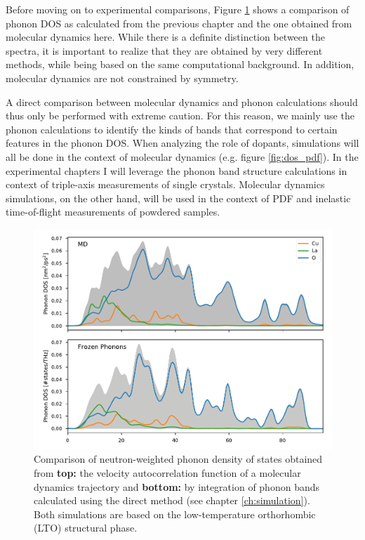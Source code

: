 Before moving on to experimental comparisons, Figure \ref{fig:md_phonopy_comparison} shows a comparison of phonon DOS as calculated from the previous chapter and the one obtained from molecular dynamics here. While there is a definite distinction between the spectra, it is important to realize that they are obtained by very different methods, while being based on the same computational background. In addition, molecular dynamics are not constrained by symmetry.

A direct comparison between molecular dynamics and phonon calculations should thus only be performed with extreme caution. For this reason, we mainly use the phonon calculations to identify the kinds of bands that correspond to certain features in the phonon DOS. When analyzing the role of dopants, simulations will all be done in the context of molecular dynamics (e.g. figure \ref{fig:dos_pdf}). In the experimental chapters I will leverage the phonon band structure calculations in context of triple-axis measurements of single crystals. Molecular dynamics simulations, on the other hand, will be used in the context of PDF and inelastic time-of-flight measurements of powdered samples.


\begin{figure}
	\centering
	\includegraphics[width=\textwidth]{fig/md/md_phonopy_comparison.pdf}
	\caption[MD Phonopy Comparison]{Comparison of neutron-weighted phonon density of states obtained from \textbf{top:} the velocity autocorrelation function of a molecular dynamics trajectory and \textbf{bottom:} by integration of phonon bands calculated using the direct method (see chapter \ref{ch:simulation}). Both simulations are based on the low-temperature orthorhombic (LTO) structural phase.}
	\label{fig:md_phonopy_comparison}
\end{figure}


